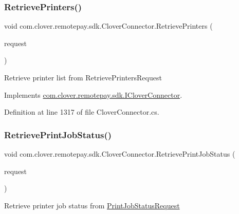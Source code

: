 \subsubsection{\texorpdfstring{Retrieve\+Printers()}{RetrievePrinters()}}
{\footnotesize\ttfamily void com.\+clover.\+remotepay.\+sdk.\+Clover\+Connector.\+Retrieve\+Printers (\begin{DoxyParamCaption}\item[{Retrieve\+Printers\+Request}]{request }\end{DoxyParamCaption})}



Retrieve printer list from Retrieve\+Printers\+Request 



Implements \hyperlink{interfacecom_1_1clover_1_1remotepay_1_1sdk_1_1_i_clover_connector_afae3060fb1b64065a2788af99031bbf4}{com.\+clover.\+remotepay.\+sdk.\+I\+Clover\+Connector}.



Definition at line 1317 of file Clover\+Connector.\+cs.

\mbox{\label{classcom_1_1clover_1_1remotepay_1_1sdk_1_1_clover_connector_a9c52815121d86654b8372a24b05874bd}} 
\subsubsection{\texorpdfstring{Retrieve\+Print\+Job\+Status()}{RetrievePrintJobStatus()}}
{\footnotesize\ttfamily void com.\+clover.\+remotepay.\+sdk.\+Clover\+Connector.\+Retrieve\+Print\+Job\+Status (\begin{DoxyParamCaption}\item[{\hyperlink{classcom_1_1clover_1_1remotepay_1_1sdk_1_1_print_job_status_request}{Print\+Job\+Status\+Request}}]{request }\end{DoxyParamCaption})}



Retrieve printer job status from \hyperlink{classcom_1_1clover_1_1remotepay_1_1sdk_1_1_print_job_status_request}{Print\+Job\+Status\+Request} 



